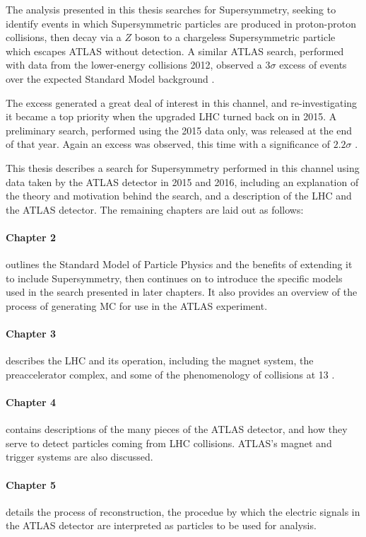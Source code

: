 The analysis presented in this thesis searches for Supersymmetry, seeking to identify events in which Supersymmetric particles are produced in proton-proton collisions, then decay via a $Z$ boson to a chargeless Supersymmetric particle which escapes ATLAS without detection. A similar ATLAS search, performed with data from the lower-energy collisions 2012, observed a $3\sigma$ excess of events over the expected Standard Model background \cite{SUSY-2014-10}. 

The excess generated a great deal of interest in this channel, and re-investigating it became a top priority when the upgraded \ac{LHC} turned back on in 2015. A preliminary search, performed using the 2015 data only, was released at the end of that year. Again an excess was observed, this time with a significance of $2.2\sigma$ \cite{ATLAS-CONF-2015-082}. 

This thesis describes a search for Supersymmetry performed in this channel using data taken by the ATLAS detector in 2015 and 2016, including an explanation of the theory and motivation behind the search, and a description of the \ac{LHC} and the ATLAS detector. The remaining chapters are laid out as follows: 

\paragraph{Chapter 2} outlines the Standard Model of Particle Physics and the benefits of extending it to include Supersymmetry, then continues on to introduce the specific models used in the search presented in later chapters. It also provides an overview of the process of generating \ac{MC} for use in the ATLAS experiment.

\paragraph{Chapter 3} describes the \ac{LHC} and its operation, including the magnet system, the preaccelerator complex, and some of the phenomenology of collisions at 13 \tev.

\paragraph{Chapter 4} contains descriptions of the many pieces of the ATLAS detector, and how they serve to detect particles coming from \ac{LHC} collisions. ATLAS's magnet and trigger systems are also discussed.

\paragraph{Chapter 5} details the process of reconstruction, the procedue by which the electric signals in the ATLAS detector are interpreted as particles to be used for analysis. 

